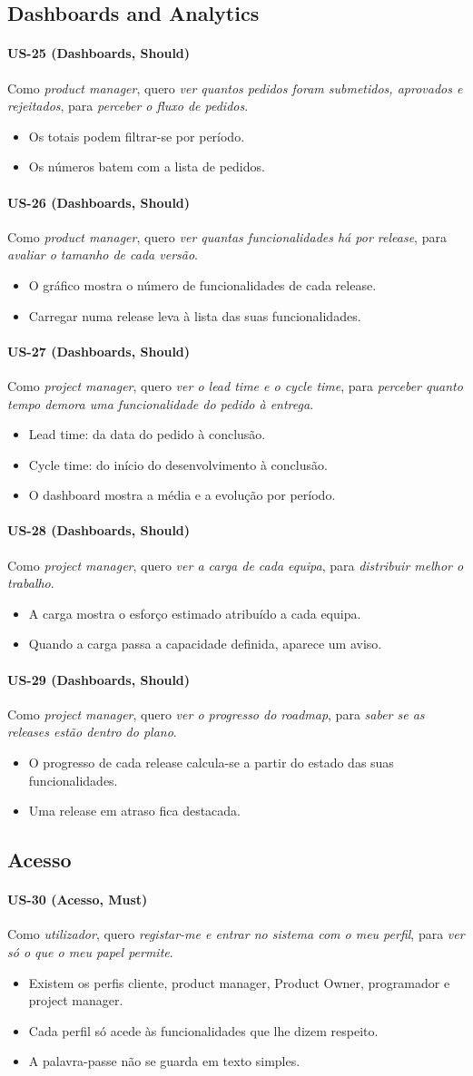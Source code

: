 \documentclass[12pt,a4paper]{article}
\newcommand{\us}[7]{%
  \paragraph{#1 \textnormal{(#2, #6)}}
  Como \textit{#3}, quero \textit{#4}, para \textit{#5}.
  \begin{itemize}
  #7
  \end{itemize}
}
\begin{document}
\subsection{Dashboards and Analytics}

\us{US-25}{Dashboards}{product manager}{ver quantos pedidos foram submetidos, aprovados e rejeitados}{perceber o fluxo de pedidos}{Should}{
\item Os totais podem filtrar-se por período.
\item Os números batem com a lista de pedidos.}

\us{US-26}{Dashboards}{product manager}{ver quantas funcionalidades há por release}{avaliar o tamanho de cada versão}{Should}{
\item O gráfico mostra o número de funcionalidades de cada release.
\item Carregar numa release leva à lista das suas funcionalidades.}

\us{US-27}{Dashboards}{project manager}{ver o lead time e o cycle time}{perceber quanto tempo demora uma funcionalidade do pedido à entrega}{Should}{
\item Lead time: da data do pedido à conclusão.
\item Cycle time: do início do desenvolvimento à conclusão.
\item O dashboard mostra a média e a evolução por período.}

\us{US-28}{Dashboards}{project manager}{ver a carga de cada equipa}{distribuir melhor o trabalho}{Should}{
\item A carga mostra o esforço estimado atribuído a cada equipa.
\item Quando a carga passa a capacidade definida, aparece um aviso.}

\us{US-29}{Dashboards}{project manager}{ver o progresso do roadmap}{saber se as releases estão dentro do plano}{Should}{
\item O progresso de cada release calcula-se a partir do estado das suas funcionalidades.
\item Uma release em atraso fica destacada.}

\subsection{Acesso}

\us{US-30}{Acesso}{utilizador}{registar-me e entrar no sistema com o meu perfil}{ver só o que o meu papel permite}{Must}{
\item Existem os perfis cliente, product manager, Product Owner, programador e project manager.
\item Cada perfil só acede às funcionalidades que lhe dizem respeito.
\item A palavra-passe não se guarda em texto simples.}
\end{document}
